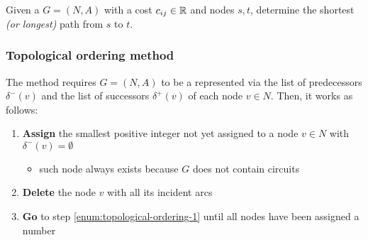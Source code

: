 \documentclass[english]{article}
\begin{document}
\begin{problem}
Given a \DAG \(G = (N, A)\) with a cost \(c_{ij} \in \mathbb{R}\) and nodes \(s, t\), determine the shortest \textit{(or longest)} path from \(s\) to \(t\).
\end{problem}

\subsubsection{Topological ordering method}

The method requires \(G = (N, A)\) to be a \DAG represented via the list of predecessors \(\delta^-(v)\) and the list of successors \(\delta^+(v)\) of each node \(v \in N\).
Then, it works as follows:

\begin{enumerate}[label=\arabic*., ref=(\arabic*)]
  \item\label{enum:topological-ordering-1} \textbf{Assign} the smallest positive integer not yet assigned to a node \(v \in N \) with \(\delta^-(v) = \emptyset\)
  \begin{itemize}[label=\(\rightarrow\)]
    \item such node always exists because \(G\) does not contain circuits
  \end{itemize}
  \item \textbf{Delete} the node \(v\) with all its incident arcs
  \item \textbf{Go} to step  \ref{enum:topological-ordering-1} until all nodes have been assigned a number
\end{enumerate}
\end{document}
